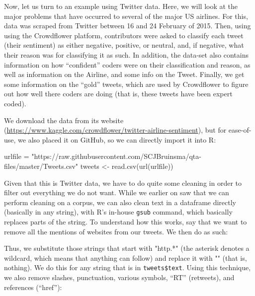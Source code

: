 \documentclass[
]{book}
\newenvironment{Shaded}{\begin{snugshade}}{\end{snugshade}}
\newcommand{\FunctionTok}[1]{\textcolor[rgb]{0.00,0.00,0.00}{#1}}
\newcommand{\NormalTok}[1]{#1}
\newcommand{\OtherTok}[1]{\textcolor[rgb]{0.56,0.35,0.01}{#1}}
\newcommand{\SpecialCharTok}[1]{\textcolor[rgb]{0.00,0.00,0.00}{#1}}
\newcommand{\StringTok}[1]{\textcolor[rgb]{0.31,0.60,0.02}{#1}}
\begin{document}
Now, let us turn to an example using Twitter data. Here, we will look at the major problems that have occurred to several of the major US airlines. For this, data was scraped from Twitter between 16 and 24 February of 2015. Then, using using the Crowdflower platform, contributors were asked to classify each tweet (their sentiment) as either negative, positive, or neutral, and, if negative, what their reason was for classifying it as such. In addition, the data-set also contains information on how ``confident'' coders were on their classification and reason, as well as information on the Airline, and some info on the Tweet. Finally, we get some information on the ``gold'' tweets, which are used by Crowdflower to figure out how well there coders are doing (that is, these tweets have been expert coded).

We download the data from its website (\url{https://www.kaggle.com/crowdflower/twitter-airline-sentiment}), but for ease-of-use, we also placed it on GitHub, so we can directly import it into R:

\begin{Shaded}
\begin{Highlighting}[]
\NormalTok{urlfile }\OtherTok{=} \StringTok{"https://raw.githubusercontent.com/SCJBruinsma/qta{-}files/master/Tweets.csv"}
\NormalTok{tweets }\OtherTok{\textless{}{-}} \FunctionTok{read.csv}\NormalTok{(}\FunctionTok{url}\NormalTok{(urlfile))}
\end{Highlighting}
\end{Shaded}

Given that this is Twitter data, we have to do quite some cleaning in order to filter out everything we do not want. While we earlier on saw that we can perform cleaning on a corpus, we can also clean text in a dataframe directly (basically in any string), with R's in-house \texttt{gsub} command, which basically replaces parts of the string. To understand how this works, say that we want to remove all the mentions of websites from our tweets. We then do as such:

\begin{Shaded}
\end{Shaded}

Thus, we substitute those strings that start with "http.*" (the asterisk denotes a wildcard, which means that anything can follow) and replace it with "" (that is, nothing). We do this for any string that is in \texttt{tweets\$text}. Using this technique, we also remove slashes, punctuation, various symbols, ``RT'' (retweets), and references (``href''):
\end{document}
